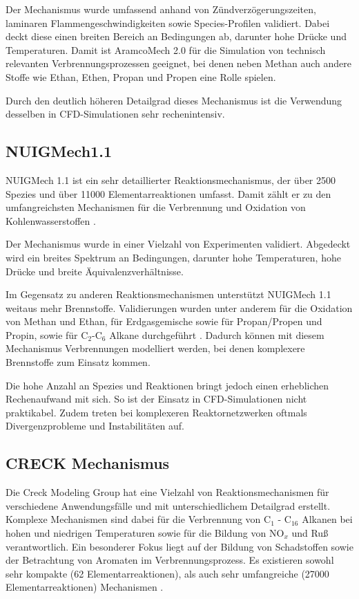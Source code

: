         Der Mechanismus wurde umfassend anhand von  Zündverzögerungszeiten, laminaren Flammengeschwindigkeiten sowie Species-Profilen validiert. Dabei deckt diese einen breiten Bereich an Bedingungen ab, darunter hohe Drücke und Temperaturen. Damit ist AramcoMech 2.0 für die Simulation von technisch relevanten Verbrennungsprozessen geeignet, bei denen neben Methan auch andere Stoffe wie Ethan, Ethen, Propan und Propen eine Rolle spielen. 

        Durch den deutlich höheren Detailgrad dieses Mechanismus ist die Verwendung desselben in CFD-Simulationen sehr rechenintensiv. 
    \subsection*{NUIGMech1.1}
        NUIGMech 1.1 ist ein sehr detaillierter Reaktionsmechanismus, der über 2500 Spezies und über 11000 Elementarreaktionen umfasst. Damit zählt er zu den umfangreichsten Mechanismen für die Verbrennung und Oxidation von Kohlenwasserstoffen \cite{MARTINEZ2021401}.

        Der Mechanismus wurde in einer Vielzahl von Experimenten validiert. Abgedeckt wird ein breites Spektrum an Bedingungen, darunter hohe Temperaturen, hohe Drücke und breite Äquivalenzverhältnisse. 

        Im Gegensatz zu anderen Reaktionsmechanismen unterstützt NUIGMech 1.1 weitaus mehr Brennstoffe. Validierungen wurden unter anderem für die Oxidation von Methan und Ethan, für Erdgasgemische sowie für Propan/Propen und Propin, sowie für C$_2$-C$_6$ Alkane durchgeführt \cite{MARTINEZ2021401}. Dadurch können mit diesem Mechanismus Verbrennungen modelliert werden, bei denen komplexere Brennstoffe zum Einsatz kommen. 

        Die hohe Anzahl an Spezies und Reaktionen bringt jedoch einen erheblichen Rechenaufwand mit sich. So ist der Einsatz in CFD-Simulationen nicht praktikabel. Zudem treten bei komplexeren Reaktornetzwerken oftmals Divergenzprobleme und Instabilitäten auf.
    \subsection*{CRECK Mechanismus}
        Die Creck Modeling Group hat eine Vielzahl von Reaktionsmechanismen für verschiedene Anwendungsfälle und mit unterschiedlichem Detailgrad erstellt. Komplexe Mechanismen sind dabei für die Verbrennung von C$_1$ - C$_{16}$ Alkanen bei hohen und niedrigen Temperaturen sowie für die Bildung von NO$_x$ und Ruß verantwortlich. Ein besonderer Fokus liegt auf der Bildung von Schadstoffen sowie der Betrachtung von Aromaten im Verbrennungsprozess. Es existieren sowohl sehr kompakte (62 Elementarreaktionen), als auch sehr umfangreiche (27000 Elementarreaktionen) Mechanismen \cite{CRECK_DetailedMechanisms}.
